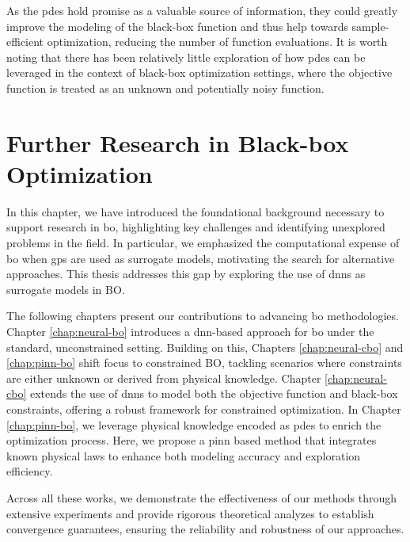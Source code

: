 As the \acp{pde} hold promise as a valuable source of information, they could greatly improve the modeling of the black-box function and thus help towards sample-efficient optimization, reducing the number of function evaluations. It is worth noting that there has been relatively little exploration of how \acp{pde} can be leveraged in the context of black-box optimization settings, where the objective function is treated as an unknown and potentially noisy function.
\section{Further Research in Black-box Optimization}
\label{section:bo_further_research}

In this chapter, we have introduced the foundational background necessary to support research in \acl{bo}, highlighting key challenges and identifying unexplored problems in the field. In particular, we emphasized the computational expense of \ac{bo} when \aclp{gp} are used as surrogate models, motivating the search for alternative approaches. This thesis addresses this gap by exploring the use of \aclp{dnn} as surrogate models in BO.

The following chapters present our contributions to advancing \ac{bo} methodologies. Chapter \ref{chap:neural-bo} introduces a \ac{dnn}-based approach for \ac{bo} under the standard, unconstrained setting. Building on this, Chapters \ref{chap:neural-cbo} and \ref{chap:pinn-bo} shift focus to constrained BO, tackling scenarios where constraints are either unknown or derived from physical knowledge. Chapter \ref{chap:neural-cbo} extends the use of \acp{dnn} to model both the objective function and black-box constraints, offering a robust framework for constrained optimization. In Chapter \ref{chap:pinn-bo}, we leverage physical knowledge encoded as \aclp{pde} to enrich the optimization process. Here, we propose a \acl{pinn} based method that integrates known physical laws to enhance both modeling accuracy and exploration efficiency.

Across all these works, we demonstrate the effectiveness of our methods through extensive experiments and provide rigorous theoretical analyzes to establish convergence guarantees, ensuring the reliability and robustness of our approaches.   



